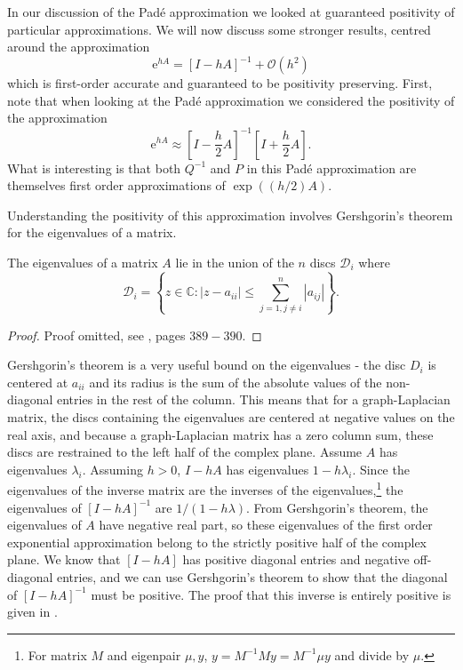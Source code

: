 In our discussion of the Pad\'e approximation we looked at guaranteed positivity of particular approximations.
We will now discuss some stronger results, centred around the approximation
\begin{equation*}
    \mathrm{e}^{hA} = \left[
        I - hA
    \right]^{-1} + \mathcal{O}(h^2)
\end{equation*}
which is first-order accurate and guaranteed to be positivity preserving.
First, note that when looking at the Pad\'e approximation we considered the positivity of the approximation
\begin{equation*}
    \mathrm{e}^{hA} \approx \left[ I - \frac{h}{2}A \right]^{-1} \left[ I + \frac{h}{2}A \right].
\end{equation*}
What is interesting is that both $Q^{-1}$ and $P$ in this Pad\'e approximation are themselves first order approximations of $\exp((h/2)A)$.

Understanding the positivity of this approximation involves Gershgorin's theorem for the eigenvalues of a matrix.
\begin{theorem}
    The eigenvalues of a matrix $A$ lie in the union of the $n$ discs $\mathcal{D}_i$ where
    \begin{equation*}
        \mathcal{D}_i = \left\{ z \in \mathds{C}: |z - a_{ii}| \leq \sum_{
            j = 1, j \ne i
        }^{n} |a_{ij}| \right\}.
    \end{equation*}    
\end{theorem}
\begin{proof}
    Proof omitted, see \cite{horn2012matrix}, pages $389-390$. 
\end{proof}

Gershgorin's theorem is a very useful bound on the eigenvalues - the disc $D_i$ is centered at $a_{ii}$ and its radius is the sum of the absolute values of the non-diagonal entries in the rest of the column.
This means that for a graph-Laplacian matrix, the discs containing the eigenvalues are centered at negative values on the real axis, and because a graph-Laplacian matrix has a zero column sum, these discs are restrained to the left half of the complex plane.
Assume $A$ has eigenvalues $\lambda_i$. Assuming $h>0$, $I - hA$ has eigenvalues $1-h \lambda_i$.
Since the eigenvalues of the inverse matrix are the inverses of the eigenvalues,\footnote{
    For matrix $M$ and eigenpair $\mu, y$, $y = M^{-1} My = M^{-1} \mu y$ and divide by $\mu$.
} the eigenvalues of $[I-hA]^{-1}$ are $1/(1-h \lambda)$.
From Gershgorin's theorem, the eigenvalues of $A$ have negative real part,
so these eigenvalues of the first order exponential approximation belong to the strictly positive half of the complex plane. %
We know that $[I-hA]$ has positive diagonal entries and negative off-diagonal entries,
and we can use Gershgorin's theorem to show that the diagonal of $[I-hA]^{-1}$ must be positive.
The proof that this inverse is entirely positive is given in \cite{blanes_pos_2022}.

